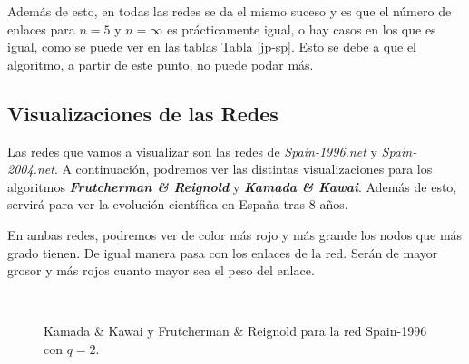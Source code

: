 \documentclass[paper=a4, fontsize=11pt]{article} %
\numberwithin{equation}{section} %
\numberwithin{figure}{section} %
\numberwithin{table}{section} %
\begin{document}
Además de esto, en todas las redes se da el mismo suceso y es que el número de enlaces para $n=5$ y $n = \infty$ es prácticamente igual, o hay casos en los que es igual, como se puede ver en las tablas \hyperref[jp-sp]{Tabla \ref*{jp-sp}}. Esto se debe a que el algoritmo, a partir de este punto, no puede podar más.

\subsection{Visualizaciones de las Redes}

Las redes que vamos a visualizar son las redes de \textit{Spain-1996.net} y \textit{Spain-2004.net}. A continuación, podremos ver las distintas visualizaciones para los algoritmos \textbf{\textit{Frutcherman \& Reignold}} y \textbf{\textit{Kamada \& Kawai}}. Además de esto, servirá para ver la evolución científica en España tras 8 años.

En ambas redes, podremos ver de color más rojo y más grande los nodos que más grado tienen. De igual manera pasa con los enlaces de la red. Serán de mayor grosor y más rojos cuanto mayor sea el peso del enlace.

\begin{figure}[H]
    \centering
    \mbox {
      \qquad
    }
    \caption{Kamada \& Kawai y Frutcherman \& Reignold para la red Spain-1996 con $q=2$.}
    \label{spq2}
\end{figure}
\end{document}

